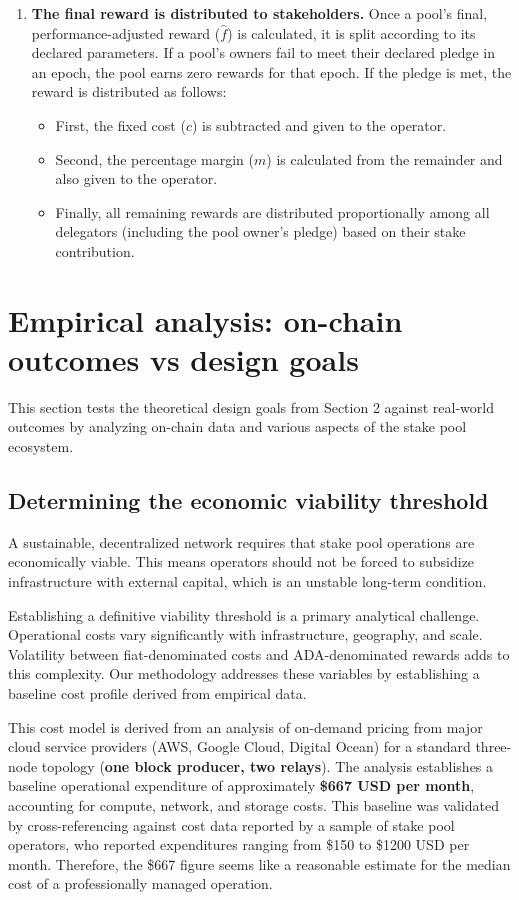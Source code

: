 \documentclass[11pt, letterpaper]{article}
\begin{document}
\begin{enumerate}
	\item \textbf{The final reward is distributed to stakeholders.} Once a pool's final, performance-adjusted
	      reward ($\hat{f}$) is calculated, it is split according to its declared parameters. If a pool's owners fail
	      to meet their declared pledge in an epoch, the pool earns zero rewards for that epoch. If the pledge is met,
	      the reward is distributed as follows:
	      \begin{itemize}
		      \item First, the fixed cost ($c$) is subtracted and given to the operator.
		      \item Second, the percentage margin ($m$) is calculated from the remainder and also
		            given to the operator.
		      \item Finally, all remaining rewards are distributed proportionally among all
		            delegators (including the pool owner's pledge) based on their stake
		            contribution.
	      \end{itemize}
\end{enumerate}

\section{Empirical analysis: on-chain outcomes vs design goals}

This section tests the theoretical design goals from Section 2 against real-world
outcomes by analyzing on-chain data and various aspects of the stake pool ecosystem.

\subsection{Determining the economic viability threshold}

A sustainable, decentralized network requires that stake pool operations are
economically viable. This means operators should not be forced to subsidize infrastructure
with external capital, which is an unstable long-term condition.

Establishing a definitive viability threshold is a primary analytical challenge. Operational
costs vary significantly with infrastructure, geography, and scale. Volatility between fiat-denominated
costs and ADA-denominated rewards adds to this complexity. Our methodology addresses these variables by
establishing a baseline cost profile derived from empirical data.

This cost model is derived from an analysis of on-demand pricing from major
cloud service providers (AWS, Google Cloud, Digital Ocean) for a standard
three-node topology (\textbf{one block producer, two relays}). The analysis
establishes a baseline operational expenditure of approximately \textbf{\$667
	USD per month}, accounting for compute, network, and storage costs. This
baseline was validated by cross-referencing against cost data reported by a
sample of stake pool operators, who reported expenditures ranging from \$150 to
\$1200 USD per month. Therefore, the \$667 figure seems like a reasonable
estimate for the median cost of a professionally managed operation.
\end{document}
